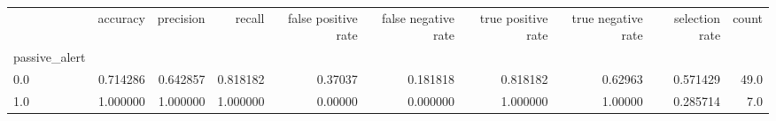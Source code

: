 \begin{tabular}{lrrrrrrrrr}
\toprule
{} &  accuracy &  precision &    recall &  false positive rate &  false negative rate &  true positive rate &  true negative rate &  selection rate &  count \\
passive\_alert &           &            &           &                      &                      &                     &                     &                 &        \\
\midrule
0.0           &  0.714286 &   0.642857 &  0.818182 &              0.37037 &             0.181818 &            0.818182 &             0.62963 &        0.571429 &   49.0 \\
1.0           &  1.000000 &   1.000000 &  1.000000 &              0.00000 &             0.000000 &            1.000000 &             1.00000 &        0.285714 &    7.0 \\
\bottomrule
\end{tabular}
